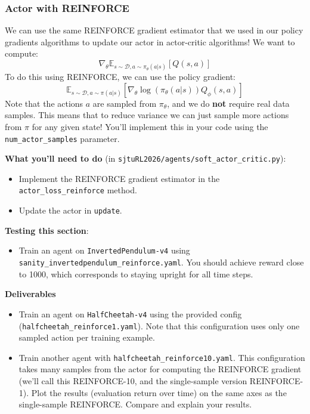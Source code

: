 \subsubsection{Actor with REINFORCE}
We can use the same REINFORCE gradient estimator that we used in our policy gradients algorithms to update our actor in actor-critic algorithms! We want to compute:
\[\nabla_\theta\mathbb{E}_{s \sim \mathcal{D}, a \sim \pi_\theta(a|s)}\left[Q(s, a)\right]\]
To do this using REINFORCE, we can use the policy gradient:
\[\mathbb{E}_{s \sim \mathcal{D}, a \sim \pi(a|s)}\left[\nabla_\theta \log(\pi_\theta(a|s))Q_\phi(s, a)\right]\]
Note that the actions $a$ are sampled from $\pi_\theta$, and we do \textbf{not} require real data samples. This means that to reduce variance we can just sample more actions from $\pi$ for any given state! You'll implement this in your code using the \verb|num_actor_samples| parameter.

\textbf{What you'll need to do} (in \verb|sjtuRL2026/agents/soft_actor_critic.py|):
\begin{itemize}
    \item Implement the REINFORCE gradient estimator in the \verb|actor_loss_reinforce| method.
    \item Update the actor in \verb|update|.
\end{itemize}

\textbf{Testing this section}:
\begin{itemize}
    \item Train an agent on \verb|InvertedPendulum-v4| using \verb|sanity_invertedpendulum_reinforce.yaml|. You should achieve reward close to 1000, which corresponds to staying upright for all time steps.
\end{itemize}

\textbf{Deliverables}
\begin{itemize}
    \item Train an agent on \verb|HalfCheetah-v4| using the provided config (\verb|halfcheetah_reinforce1.yaml|). Note that this configuration uses only one sampled action per training example.
    \item Train another agent with \verb|halfcheetah_reinforce10.yaml|. This configuration takes many samples from the actor for computing the REINFORCE gradient (we'll call this REINFORCE-10, and the single-sample version REINFORCE-1). Plot the results (evaluation return over time) on the same axes as the single-sample REINFORCE. Compare and explain your results.
\end{itemize}
\sacAnswerReinforce

